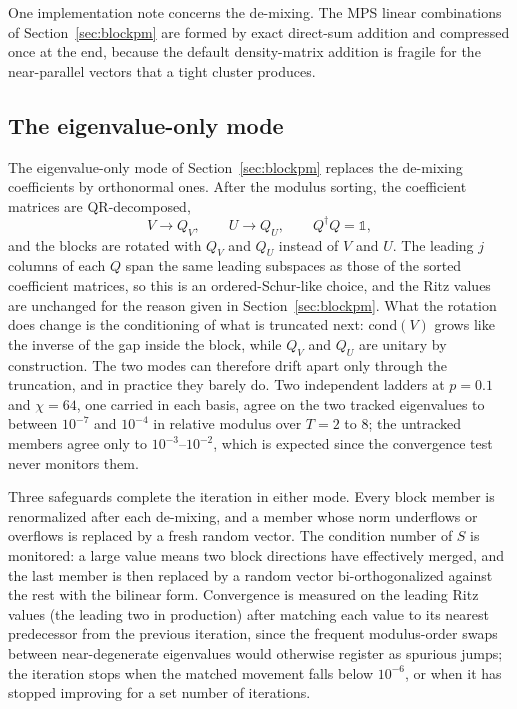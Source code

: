 One implementation note concerns the de-mixing. The MPS linear combinations of Section~\ref{sec:blockpm} are formed by exact direct-sum addition and compressed once at the end, because the default density-matrix addition is fragile for the near-parallel vectors that a tight cluster produces.

\subsection{The eigenvalue-only mode}
\label{app:blockpm:schur}

The eigenvalue-only mode of Section~\ref{sec:blockpm} replaces the de-mixing coefficients by orthonormal ones. After the modulus sorting, the coefficient matrices are QR-decomposed,
\begin{equation}
  V \to Q_V, \qquad U \to Q_U, \qquad Q^\dagger Q = \mathbb{1},
  \tag{D3}
\end{equation}
and the blocks are rotated with $Q_V$ and $Q_U$ instead of $V$ and $U$. The leading $j$ columns of each $Q$ span the same leading subspaces as those of the sorted coefficient matrices, so this is an ordered-Schur-like choice, and the Ritz values are unchanged for the reason given in Section~\ref{sec:blockpm}. What the rotation does change is the conditioning of what is truncated next: $\mathrm{cond}(V)$ grows like the inverse of the gap inside the block, while $Q_V$ and $Q_U$ are unitary by construction. The two modes can therefore drift apart only through the truncation, and in practice they barely do. Two independent ladders at $p=0.1$ and $\chi=64$, one carried in each basis, agree on the two tracked eigenvalues to between $10^{-7}$ and $10^{-4}$ in relative modulus over $T=2$ to $8$; the untracked members agree only to $10^{-3}$--$10^{-2}$, which is expected since the convergence test never monitors them.

Three safeguards complete the iteration in either mode. Every block member is renormalized after each de-mixing, and a member whose norm underflows or overflows is replaced by a fresh random vector. The condition number of $S$ is monitored: a large value means two block directions have effectively merged, and the last member is then replaced by a random vector bi-orthogonalized against the rest with the bilinear form. Convergence is measured on the leading Ritz values (the leading two in production) after matching each value to its nearest predecessor from the previous iteration, since the frequent modulus-order swaps between near-degenerate eigenvalues would otherwise register as spurious jumps; the iteration stops when the matched movement falls below $10^{-6}$, or when it has stopped improving for a set number of iterations.

